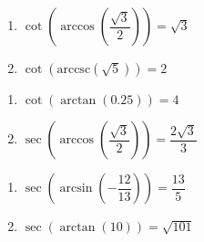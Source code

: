 \begin{multicols}{2}

\begin{enumerate}

\setcounter{enumi}{\value{HW}}

\item  $\cot\left(\arccos\left(\dfrac{\sqrt{3}}{2}\right)\right) = \sqrt{3}$
\item  $\cot\left(\text{arccsc}\left(\sqrt{5}\right)\right) = 2$ 

\setcounter{HW}{\value{enumi}}

\end{enumerate}

\end{multicols}

\begin{multicols}{2}

\begin{enumerate}

\setcounter{enumi}{\value{HW}}

\item  $\cot\left(\arctan \left( 0.25 \right)\right) = 4$ 
\item  $\sec\left(\arccos\left(\dfrac{\sqrt{3}}{2}\right)\right) = \dfrac{2\sqrt{3}}{3}$

\setcounter{HW}{\value{enumi}}

\end{enumerate}

\end{multicols}

\begin{multicols}{2}

\begin{enumerate}

\setcounter{enumi}{\value{HW}}

\item  $\sec\left(\arcsin\left(-\dfrac{12}{13}\right)\right) = \dfrac{13}{5}$
\item  $\sec\left(\arctan\left(10\right)\right) = \sqrt{101}$ 

\setcounter{HW}{\value{enumi}}

\end{enumerate}

\end{multicols}


